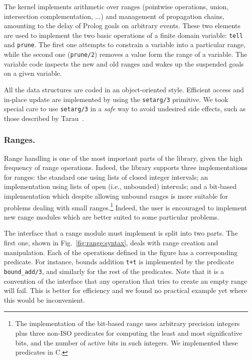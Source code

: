 \documentclass{llncs}
\begin{document}
The kernel implements arithmetic over ranges (pointwise operations,
union, intersection complementation, ...) and management of
propagation chains, amounting to the delay of Prolog goals on
arbitrary events. These two elements are used to implement the two
basic operations of a finite domain variable: \verb!tell! and
\verb!prune!. The first one attempts to constrain a variable into a
particular range, while the second one ({\tt prune/2}) removes a value
form the range of a variable.
The variable code inspects the new and old ranges and wakes up the
suspended goals on a given variable.

All the data structures are coded in an object-oriented style.
Efficient access and in-place update are implemented by using the
\verb!setarg/3! primitive. We took special care to use \verb!setarg/3!
in a \emph{safe} way to avoid undesired side effects, such as those
described by Tarau~\cite{binprolog2006}.

\subsubsection{Ranges.}
Range handling is one of the most important parts of the library,
given the high frequency of range operations. Indeed, the library
supports three implementations for ranges: the standard one using
lists of closed integer intervals; an implementation using lists of
open (i.e., unbounded) intervals; and a bit-based implementation which
despite allowing unbound ranges is more suitable for problems
dealing with small ranges.\footnote{The implementation of the
  bit-based range uses arbitrary precision integers plus three non-ISO
  predicates for computing the least and most significative bits, and
  the number of active bits in such
  integers.  We implemented these predicates in C.} Indeed, the user is encouraged to implement new range modules which
are better suited to some particular problems.

The interface that a range module must implement is split into two
parts. The first one, shown in Fig.~\ref{fig:range:syntax}, deals with
range creation and manipulation. Each of the operations defined in the
figure has a corresponding predicate. For instance, bounds addition
\verb!t+t! is implemented by the predicate \verb!bound_add/3!, and
similarly for the rest of the predicates. Note that it is a convention
of the interface that any operation that tries to create an empty
range will fail. This is better for efficiency and we found no
practical example yet where this would be inconvenient.
\end{document}
